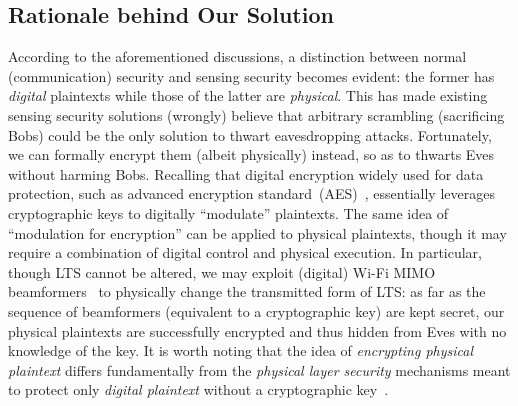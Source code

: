 \documentclass[conference,compsoc]{IEEEtran}
\newcommand{\newrev}[1]{{\color{blue}#1}}    %
\newcommand{\newrev}[1]{#1}
\begin{document}

\vspace{-1ex}
\subsection{Rationale behind Our Solution}
\vspace{-1ex}
%
\newrev{
According to the aforementioned discussions, a distinction between normal (communication) security and sensing security becomes evident: the former has \textit{digital} plaintexts while those of the latter are \textit{physical}. This has made existing sensing security solutions (wrongly) believe that arbitrary scrambling (sacrificing Bobs) could be the only solution to thwart eavesdropping attacks. Fortunately, 
we can formally encrypt them (albeit physically) instead, so as to thwarts Eves without harming Bobs.
%
Recalling that digital encryption widely used for data protection, such as advanced encryption standard~(AES)~\cite{heron2009advanced}, essentially leverages cryptographic keys to digitally ``modulate'' plaintexts.
%
The same idea of ``modulation for encryption'' can be applied to physical plaintexts, though it may require a combination of digital control and physical execution. In particular, though LTS cannot be altered, we may exploit (digital) Wi-Fi
%
%
MIMO beamformers~\cite{van2004implementation} to physically change the transmitted form of LTS: as far as the sequence of beamformers (equivalent to a cryptographic key) are kept secret, our physical plaintexts are successfully encrypted and thus hidden from Eves with no knowledge of the key.
%
It is worth noting that the idea of \textit{encrypting physical plaintext} differs fundamentally from the \textit{physical layer security} mechanisms meant to protect only \textit{digital plaintext} without a cryptographic key~\cite{Strobe, KPA-NDSS14, Robin}.
%

}
\end{document}
